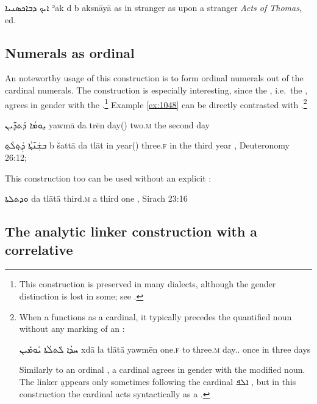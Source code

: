 {{{{
{ܐܝܟ ܕܒܐܟܣܢܝܐ}
{ʾak  d\cb{} b\cb{} aksnāyā}
{as  \lnkcomp\cb{} in\cb{} stranger}
{as upon a stranger}
{\textit{Acts of Thomas}, ed.\ \cite[]{WrightActs}}

\subsection{Numerals as ordinal \secns} \label{ss:syr_lnk_ord}

An noteworthy usage of this construction is to form ordinal numerals out of the cardinal numerals. The construction is especially interesting, since the \secn, i.e.\ the , agrees in gender with the \prim.\footnote{This construction is preserved in many  dialects, although the gender distinction is lost in some; see .}  Example \ref{ex:1048} can be directly contrasted with .\footnote{When a  functions as a cardinal, it typically precedes the quantified noun without any marking of an :


{ܚܕܳܐ ܠܰܬܠܳܬܳܐ ܝܰܘܡܺܝܢ}
{xdā la\cb{} tlātā yawmēn}
{one.\textsc{f} to\cb{} three.\textsc{m} day.\pl.\abs}
{once in three days}
{\cite[614]{CSD}}\antipar 

Similarly to an ordinal , a cardinal  agrees in gender with the modified noun. The linker \d appears only sometimes following the cardinal \textsyriac{ܐܠܦ} , but in this construction the cardinal acts syntactically as a \prim \citep[see][177, \S239]{NoldekeSyriac}.}

{ܝܱܘܡܳܐ ܕܰܬܖܷ̈ܝܢ}
{yawmā da\cb{} trēn}
{day(\masc) \lnk\cb{} two.\textsc{m}}
{the second day}
{\cite[178, \S 239]{NoldekeSyriac}}

{ܒܫܲܢ̄ܬ݂ܵܐ ܕܲܬ݂ܠܵܬ݂}
{b\cb{} šattā da\cb{} tlāt}
{in\cb{} year(\fem) \lnk\cb{} three.\textsc{f}}
{in the third year}
{\Pesh, Deuteronomy 26:12; \cite[38, \S 44b]{MuraokaSyriac}}


This construction too can be used without an explicit \prim:

{ܘܕܬܠܬܐ}
{da\cb{} tlātā}
{\lnk\cb{} third.\textsc{m}}
{a third one}
{\Pesh, Sirach 23:16 \apud \cite[258]{PeursenBenSira}}

\subsection{The analytic linker construction with a correlative} \label{ss:syr_corr}
\largerpage[2]

}}}}
